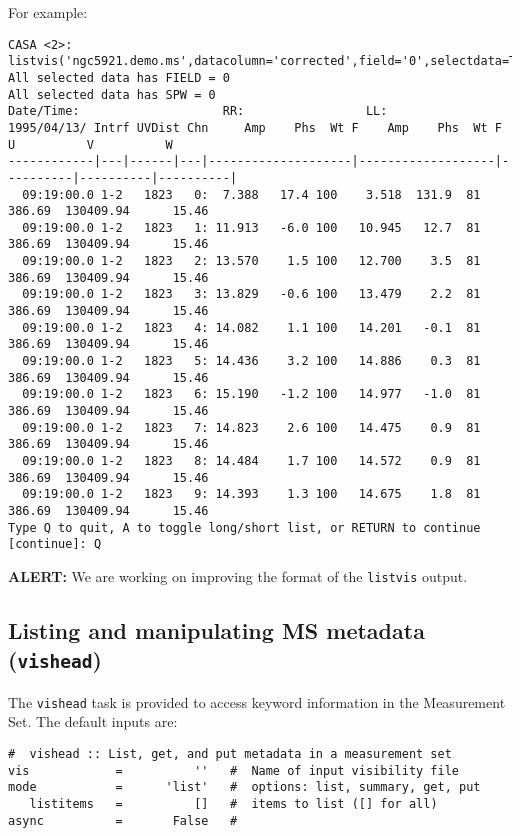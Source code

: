 For example:
\small
\begin{verbatim}
CASA <2>: listvis('ngc5921.demo.ms',datacolumn='corrected',field='0',selectdata=T,antenna='*&*',pagerows=10)
All selected data has FIELD = 0
All selected data has SPW = 0
Date/Time:                    RR:                 LL:                                                
1995/04/13/ Intrf UVDist Chn     Amp    Phs  Wt F    Amp    Phs  Wt F          U          V          W
------------|---|------|---|--------------------|-------------------|----------|----------|----------|
  09:19:00.0 1-2   1823   0:  7.388   17.4 100    3.518  131.9  81       386.69  130409.94      15.46
  09:19:00.0 1-2   1823   1: 11.913   -6.0 100   10.945   12.7  81       386.69  130409.94      15.46
  09:19:00.0 1-2   1823   2: 13.570    1.5 100   12.700    3.5  81       386.69  130409.94      15.46
  09:19:00.0 1-2   1823   3: 13.829   -0.6 100   13.479    2.2  81       386.69  130409.94      15.46
  09:19:00.0 1-2   1823   4: 14.082    1.1 100   14.201   -0.1  81       386.69  130409.94      15.46
  09:19:00.0 1-2   1823   5: 14.436    3.2 100   14.886    0.3  81       386.69  130409.94      15.46
  09:19:00.0 1-2   1823   6: 15.190   -1.2 100   14.977   -1.0  81       386.69  130409.94      15.46
  09:19:00.0 1-2   1823   7: 14.823    2.6 100   14.475    0.9  81       386.69  130409.94      15.46
  09:19:00.0 1-2   1823   8: 14.484    1.7 100   14.572    0.9  81       386.69  130409.94      15.46
  09:19:00.0 1-2   1823   9: 14.393    1.3 100   14.675    1.8  81       386.69  130409.94      15.46
Type Q to quit, A to toggle long/short list, or RETURN to continue [continue]: Q

\end{verbatim}
\normalsize

{\bf ALERT:} We are working on improving the format of the {\tt listvis} output.

\subsection{Listing and manipulating MS metadata ({\tt vishead})}
\label{section:io.vis.vishead}

The {\tt vishead} task is provided to access keyword information in
the Measurement Set.  The default inputs are:
\small
\begin{verbatim}
#  vishead :: List, get, and put metadata in a measurement set
vis            =          ''   #  Name of input visibility file
mode           =      'list'   #  options: list, summary, get, put
   listitems   =          []   #  items to list ([] for all)
async          =       False   #  
\end{verbatim}
\normalsize

